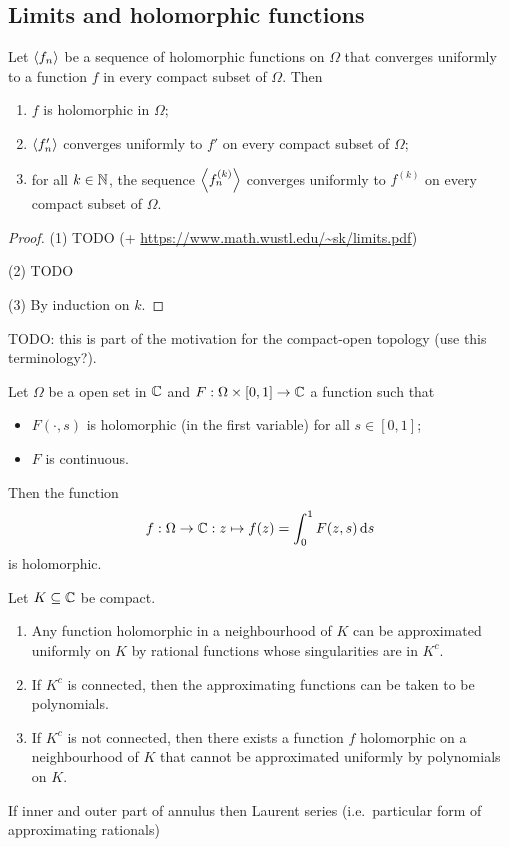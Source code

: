 \subsection{Limits and holomorphic functions}
\begin{proposition}
Let $\left\langle f_n \right\rangle$ be a sequence of holomorphic functions on $\Omega$ that converges uniformly to a function $f$ in every compact subset of $\Omega$. Then
\begin{enumerate}
\item $f$ is holomorphic in $\Omega$;
\item $\left\langle f_n' \right\rangle$ converges uniformly to $f'$ on every compact subset of $\Omega$;
\item for all $k\in \mathbb{N}$, the sequence $\left\langle f_n^{(k)} \right\rangle$ converges uniformly to $f^{(k)}$ on every compact subset of $\Omega$.
\end{enumerate}
\end{proposition}
\begin{proof}
(1) TODO (+ \url{https://www.math.wustl.edu/~sk/limits.pdf})

(2) TODO

(3) By induction on $k$.
\end{proof}
TODO: this is part of the motivation for the compact-open topology (use this terminology?).

\begin{proposition}
Let $\Omega$ be a open set in $\mathbb{C}$ and $F: \Omega\times[0,1]\to \mathbb{C}$ a function such that
\begin{itemize}
\item $F(\cdot,s)$ is holomorphic (in the first variable) for all $s\in [0,1]$;
\item $F$ is continuous.
\end{itemize}
Then the function
\[ f: \Omega \to \mathbb{C}: z\mapsto f(z) = \int_0^1F(z,s)\operatorname{d \!}{s} \]
is holomorphic.
\end{proposition}

\begin{proposition}
Let $K\subseteq \mathbb{C}$ be compact.
\begin{enumerate}
\item Any function holomorphic in a neighbourhood of $K$ can be approximated uniformly on $K$ by rational functions whose singularities are in $K^c$.
\item If $K^c$ is connected, then the approximating functions can be taken to be polynomials.
\item If $K^c$ is not connected, then there exists a function $f$ holomorphic on a neighbourhood of $K$ that cannot be approximated uniformly by polynomials on $K$.
\end{enumerate}
\end{proposition}
If inner and outer part of annulus then Laurent series (i.e.\ particular form of approximating rationals)

